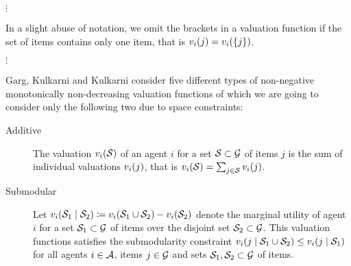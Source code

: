 \(\vdots\)

In a slight abuse of notation, we omit the brackets in a valuation function if the set of items contains only one item, that is \(\valuations[i][j] = \valuations[i][\{j\}]\).

\(\vdots\)

Garg, Kulkarni and Kulkarni consider five different types of non-negative monotonically non-decreasing valuation functions of which we are going to consider only the following two due to space constraints:
\begin{description}
	\item[Additive]
	The valuation \(\valuations[i][\genericset]\) of an agent \(i\) for a set \(\mathcal{S} \subset \mathcal{G}\) of items \(j\) is the sum of individual valuations \(\valuations[i][j]\), that is \(\valuations[i][\genericset] = \sum_{j \in \genericset} \valuations[i][j]\).

	\item[Submodular]
	Let \(\valuations[i][\genericset_1 \given \genericset_2] \coloneq \valuations[i][\genericset_1 \cup \genericset_2] - \valuations[i][\genericset_2]\) denote the marginal utility of agent~\(i\) for a set \(\mathcal{S}_1 \subset \mathcal{G}\) of items over the disjoint set \(\mathcal{S}_2 \subset \mathcal{G}\).
	This valuation functions satisfies the submodularity constraint \(\valuations[i][j \given \genericset_1 \cup \genericset_2] \leq \valuations[i][j \given \genericset_1]\) for all agents \(i \in \mathcal{A}\), items \(j \in \mathcal{G}\) and sets \(\mathcal{S}_1, \mathcal{S}_2 \subset \mathcal{G}\) of items.
\end{description}

\blindtext[4]